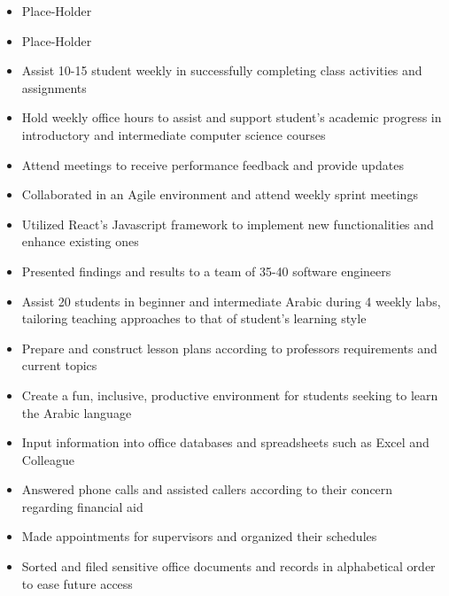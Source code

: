 \begin{itemize}
    \item Place-Holder
    \item Place-Holder
\end{itemize}
\smallskip
{}
\begin{itemize}
    \item Assist 10-15  student weekly in successfully completing class activities and assignments
    \item Hold weekly office hours to assist and support student’s academic progress in introductory and intermediate computer science courses
    \item Attend meetings to receive performance feedback and provide updates
\end{itemize}
\smallskip
{}
\begin{itemize}
    \item Collaborated in an Agile environment and attend weekly sprint meetings
    \item Utilized React’s Javascript framework to implement new functionalities and enhance existing ones
    \item Presented findings and results to a team of 35-40 software engineers
\end{itemize}
\smallskip
{}
\begin{itemize}
    \item Assist 20 students in beginner and intermediate Arabic during 4 weekly labs, tailoring teaching approaches to that of student’s learning style
    \item Prepare and construct lesson plans according to professors requirements and current topics
    \item Create a fun, inclusive, productive environment for students seeking to learn the Arabic language
\end{itemize}
\smallskip
{}
\begin{itemize}
    \item Input information into office databases and spreadsheets such as Excel and Colleague
    \item Answered phone calls and assisted callers according to their concern regarding financial aid
    \item Made appointments for supervisors and organized their schedules
    \item Sorted and filed sensitive office documents and records in alphabetical order to ease future access
\end{itemize}
